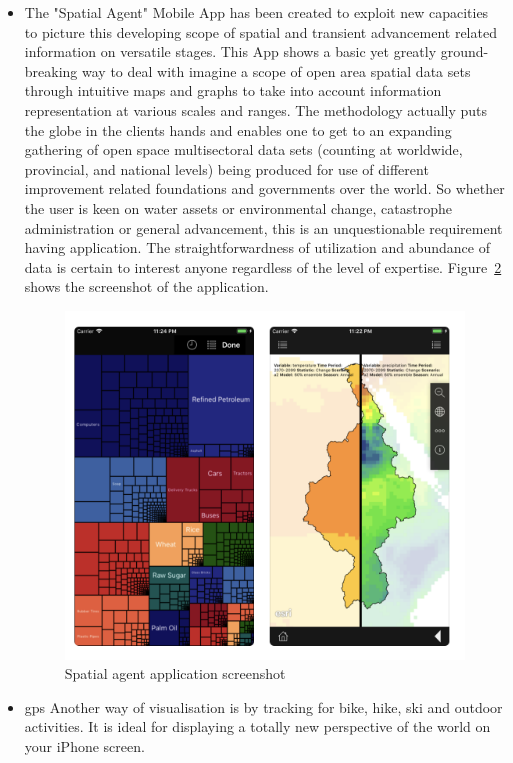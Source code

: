 \begin{itemize}
\begin{figure}[!htb]
\begin{minipage}{0.35\textwidth}
            \caption{Mobile data collection application screenshot - 2 \cite{GIS_cloud_mobile_data_collection}}\label{Fig:mobile_data_collection_2}
        \end{minipage}
\end{figure}

  
  \item The "Spatial Agent" Mobile App has been created to exploit new capacities to picture this developing scope of spatial and transient advancement related information on versatile stages. This App shows a basic yet greatly ground-breaking way to deal with imagine a scope of open area spatial data sets through intuitive maps and graphs to take into account information representation at various scales and ranges. The methodology actually puts the globe in the clients hands and enables one to get to an expanding gathering of open space multisectoral data sets (counting at worldwide, provincial, and national levels) being produced for use of different improvement related foundations and governments over the world. So whether the user is keen on water assets or environmental change, catastrophe administration or general advancement, this is an unquestionable requirement having application. The straightforwardness of utilization and abundance of data is certain to interest anyone regardless of the level of expertise. Figure~\ref{fig:spatial_agent} shows the screenshot of the application. \cite{Spatial_Agent}

  \begin{figure}[H]
            \centering
            \includegraphics[width=0.5\linewidth]{figures/ch1/spatial_agent.png}
            \caption{\label{fig:spatial_agent} Spatial agent application screenshot \cite{Spatial_Agent}}
    \end{figure}
  
  \item \gls{gps} Another way of visualisation is by tracking for bike, hike, ski and outdoor activities. It is ideal for displaying a totally new perspective of the world on your iPhone screen.
  

\end{itemize}
